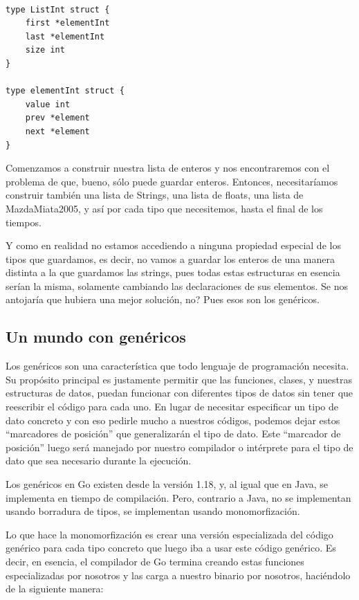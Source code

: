 \documentclass[11pt]{article}
\begin{document}
\begin{verbatim}

type ListInt struct {
	first *elementInt
	last *elementInt
	size int
}

type elementInt struct {
	value int
	prev *element
	next *element
}

\end{verbatim}

Comenzamos a construir nuestra lista de enteros y nos encontraremos con el problema de que, bueno, sólo puede guardar enteros.
Entonces, necesitaríamos construir también una lista de Strings, una lista de floats, una lista de MazdaMiata2005, y así por cada tipo que necesitemos, hasta el final de los tiempos.

Y como en realidad no estamos accediendo a ninguna propiedad especial de los tipos que guardamos, es decir, no vamos a guardar los enteros de una manera distinta a la que guardamos las strings, pues todas estas estructuras en esencia serían la misma, solamente cambiando las declaraciones de sus elementos. Se nos antojaría que hubiera una mejor solución, no? Pues esos son los genéricos.
\subsection{Un mundo con genéricos}
\label{sec:org136d660}

Los genéricos son una característica que todo lenguaje de programación necesita. Su propósito principal es justamente permitir que las funciones, clases, y nuestras estructuras de datos, puedan funcionar con diferentes tipos de datos sin tener que reescribir el código para cada uno. En lugar de necesitar especificar un tipo de dato concreto y con eso pedirle mucho a nuestros códigos, podemos dejar estos ``marcadores de posición'' que generalizarán el tipo de dato. Este ``marcador de posición'' luego será manejado por nuestro compilador o intérprete para el tipo de dato que sea necesario durante la ejecución.

Los genéricos en Go existen desde la versión 1.18, y, al igual que en Java, se implementa en tiempo de compilación. Pero, contrario a Java, no se implementan usando borradura de tipos, se implementan usando monomorfización.

Lo que hace la monomorfización es crear una versión especializada del código genérico para cada tipo concreto que luego iba a usar este código genérico. Es decir, en esencia, el compilador de Go termina creando estas funciones especializadas por nosotros y las carga a nuestro binario por nosotros, haciéndolo de la siguiente manera:
\end{document}
